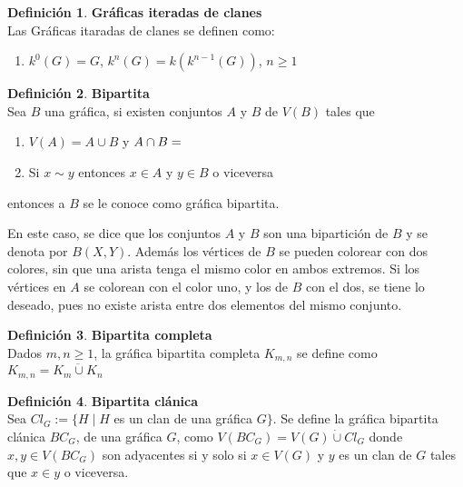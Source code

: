 \documentclass[11pt]{book}
\theoremstyle{definition}
\newtheorem{definition}{Definición}
\newcounter{in}
\newcounter{ini}
\begin{document}
\begin{definition}\textbf{Gráficas iteradas de clanes}\\
Las Gráficas itaradas de clanes se definen como:
 
\begin{enumerate}
\item $k^0(G)=G$, $k^n(G)=k(k^{n-1}(G))$, $n\ge 1$
\end{enumerate}

\end{definition}

\begin{definition}\textbf{Bipartita}\\
Sea $B$ una gráfica, si existen conjuntos $A$ y $B$ de $V(B)$ tales que 
\begin{enumerate}
\item $V(A)=A\cup B$ y $A\cap B=\empty$ 
\item Si $x\sim y$ entonces $x\in A$ y $y\in B$ o viceversa
\end{enumerate}
entonces a $B$ se le conoce como gráfica bipartita.
\end{definition}

En este caso, se dice que los conjuntos $A$ y $B$ son una bipartición de $B$ y se denota por $B(X,Y)$. Además los vértices de $B$ se pueden colorear con dos colores, sin que una arista tenga el mismo color en ambos extremos. Si los vértices en $A$ se colorean con el color uno, y los de $B$ con el dos, se tiene lo deseado, pues no existe arista entre dos elementos del mismo conjunto.



\begin{definition}\textbf{Bipartita completa}\\
Dados $m,n\geq 1$, la gráfica bipartita completa $K_{m,n}$ se define
como $K_{m,n}=\overline{K_m \cup K_n}$
\end{definition}


\begin{definition}\textbf{Bipartita clánica}\\
Sea $Cl_G:=\{H \mid H$ es un clan de una gráfica $G \}$. Se define la gráfica bipartita clánica $BC_G$, de una gráfica $G$, como $V(BC_G)=V(G)\dot{\cup}Cl_G$ donde $x,y\in V(BC_G)$ son adyacentes si y solo si $x\in V(G)$ y $y$ es un clan de $G$ tales que $x\in y$ o viceversa.   
\end{definition}
\end{document}
